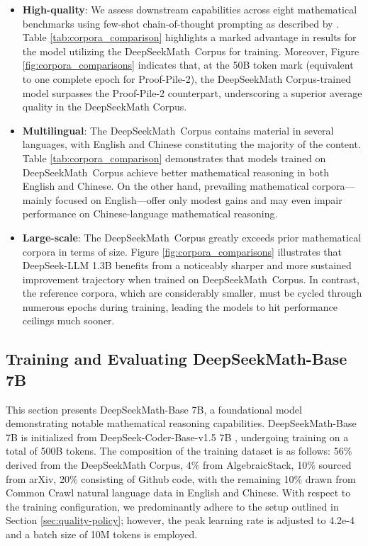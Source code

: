 \begin{itemize}[topsep=0pt]
\begin{itemize}[topsep=0pt]
    \item \textbf{High-quality}:
    We assess downstream capabilities across eight mathematical benchmarks using few-shot chain-of-thought prompting as described by \cite{cot}. Table \ref{tab:corpora_comparison} highlights a marked advantage in results for the model utilizing the DeepSeekMath~Corpus for training. Moreover, Figure \ref{fig:corpora_comparisons} indicates that, at the 50B token mark (equivalent to one complete epoch for Proof-Pile-2), the DeepSeekMath Corpus-trained model surpasses the Proof-Pile-2 counterpart, underscoring a superior average quality in the DeepSeekMath Corpus.
    \item \textbf{Multilingual}:
    The DeepSeekMath~Corpus contains material in several languages, with English and Chinese constituting the majority of the content. Table \ref{tab:corpora_comparison} demonstrates that models trained on DeepSeekMath~Corpus achieve better mathematical reasoning in both English and Chinese. On the other hand, prevailing mathematical corpora—mainly focused on English—offer only modest gains and may even impair performance on Chinese-language mathematical reasoning.
    \item \textbf{Large-scale}:
    The DeepSeekMath~Corpus greatly exceeds prior mathematical corpora in terms of size. Figure \ref{fig:corpora_comparisons} illustrates that DeepSeek-LLM 1.3B benefits from a noticeably sharper and more sustained improvement trajectory when trained on DeepSeekMath~Corpus. In contrast, the reference corpora, which are considerably smaller, must be cycled through numerous epochs during training, leading the models to hit performance ceilings much sooner.
\end{itemize}

\subsection{Training and Evaluating DeepSeekMath-Base 7B}

This section presents DeepSeekMath-Base 7B, a foundational model demonstrating notable mathematical reasoning capabilities. DeepSeekMath-Base 7B is initialized from DeepSeek-Coder-Base-v1.5 7B \citep{deepseek-coder}, undergoing training on a total of 500B tokens. The composition of the training dataset is as follows: 56\% derived from the DeepSeekMath Corpus, 4\% from AlgebraicStack, 10\% sourced from arXiv, 20\% consisting of Github code, with the remaining 10\% drawn from Common Crawl natural language data in English and Chinese. With respect to the training configuration, we predominantly adhere to the setup outlined in Section \ref{sec:quality-policy}; however, the peak learning rate is adjusted to 4.2e-4 and a batch size of 10M tokens is employed.


\end{itemize}
